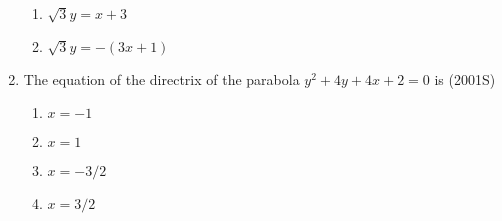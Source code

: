 \documentclass[journal,12pt,twocolumn]{IEEEtran}
\theoremstyle{remark}
\begin{document}
\begin{enumerate}
\begin{enumerate}
    \item $\sqrt{3}y=x+3$
    \item $\sqrt{3}y=-(3x+1)$\\
\end{enumerate}
    \item The equation of the directrix of the parabola $y^2+4y+4x+2=0$ is \hfill (2001S)
\begin{enumerate}
    \item $x=-1$
    \item $x=1$
    \item $x=-3/2$
     \item $x=3/2$
\end{enumerate}
\end{enumerate}

\renewcommand{\thefigure}{\theenumi}
\renewcommand{\thetable}{\theenumi}
\end{document}
